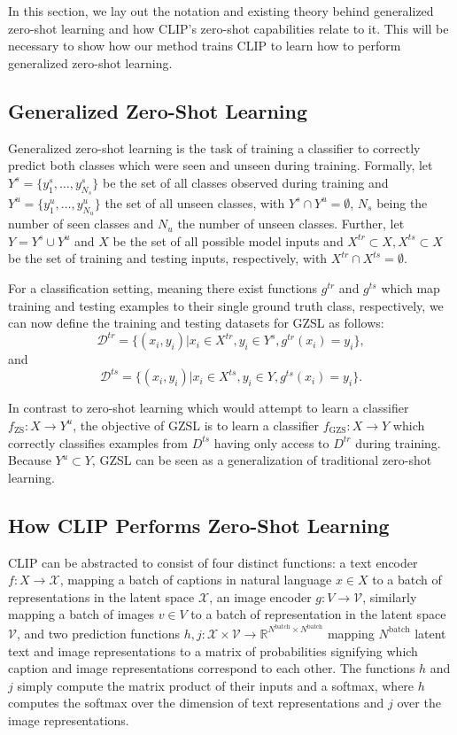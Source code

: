 \documentclass{article}
\begin{document}
In this section, we lay out the notation and existing theory behind generalized zero-shot learning and how CLIP's zero-shot capabilities relate to it. This will be necessary to show how our method trains CLIP to learn how to perform generalized zero-shot learning.

\subsection{Generalized Zero-Shot Learning}

Generalized zero-shot learning is the task of training a classifier to correctly predict both classes which were seen and unseen during training. Formally, let $Y^{s} = \{y^s_1, \ldots, y^{s}_{N_s}\}$ be the set of all classes observed during training and $Y^{u} = \{y^u_1, \ldots, y^{u}_{N_u}\}$ the set of all unseen classes, with $Y^s \cap Y^u = \emptyset$, $N_s$ being the number of seen classes and $N_u$ the number of unseen classes. Further, let $Y = Y^s \cup Y^u$ and $X$ be the set of all possible model inputs and $X^{tr} \subset X, X^{ts} \subset X$ be the set of training and testing inputs, respectively, with $X^{tr} \cap X^{ts} = \emptyset$.

For a classification setting, meaning there exist functions $g^{tr}$ and $g^{ts}$ which map training and testing examples to their single ground truth class, respectively, we can now define the training and testing datasets for GZSL as follows: $$\mathcal{D}^{tr} = \{(x_i, y_i) | x_i \in X^{tr}, y_i \in Y^s, g^{tr}(x_i) = y_i\},$$ and $$\mathcal{D}^{ts} = \{(x_i, y_i) | x_i \in X^{ts}, y_i \in Y, g^{ts}(x_i) = y_i\}.$$

In contrast to zero-shot learning which would attempt to learn a classifier $f_{\text{ZS}} : X \rightarrow Y^u$, the objective of GZSL is to learn a classifier $f_{\text{GZS}} : X \rightarrow Y$ which correctly classifies examples from $D^{ts}$ having only access to $D^{tr}$ during training. Because $Y^u \subset Y$, GZSL can be seen as a generalization of traditional zero-shot learning.

\subsection{How CLIP Performs Zero-Shot Learning}
\label{sec_clip_math}

CLIP can be abstracted to consist of four distinct functions: a text encoder $f : X \rightarrow \mathcal{X}$, mapping a batch of captions in natural language $x \in X$ to a batch of representations in the latent space $\mathcal{X}$, an image encoder $g : V \rightarrow \mathcal{V}$, similarly mapping a batch of images $v \in V$ to a batch of representation in the latent space $\mathcal{V}$, and two prediction functions $h, j : \mathcal{X} \times \mathcal{V} \rightarrow \mathbb{R}^{N^{\text{batch}} \times N^{\text{batch}}}$ mapping $N^{\text{batch}}$ latent text and image representations to a matrix of probabilities signifying which caption and image representations correspond to each other. The functions $h$ and $j$ simply compute the matrix product of their inputs and a softmax, where $h$ computes the softmax over the dimension of text representations and $j$ over the image representations.
\end{document}
